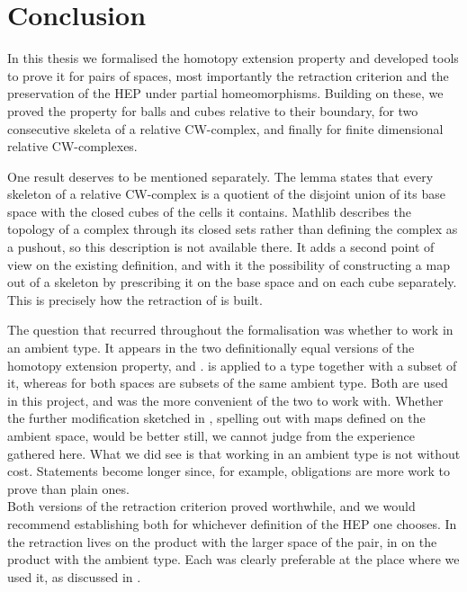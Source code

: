 \documentclass[11pt, a4paper, english]{article}
\theoremstyle{plain}
\theoremstyle{definition}
\theoremstyle{remark}
\numberwithin{equation}{section}
\numberwithin{theorem}{section}
\begin{document}
\clearpage
\section{Conclusion} \label{section:conclusion}
In this thesis we formalised the homotopy extension property and developed tools to prove it for pairs of spaces, most importantly the retraction criterion and the preservation of the HEP under partial homeomorphisms. Building on these, we proved the property for balls and cubes relative to their boundary, for two consecutive skeleta of a relative CW-complex, and finally for finite dimensional relative CW-complexes.

One result deserves to be mentioned separately. The lemma  states that every skeleton of a relative CW-complex is a quotient of the disjoint union of its base space with the closed cubes of the cells it contains. Mathlib describes the topology of a complex through its closed sets rather than defining the complex as a pushout, so this description is not available there. It adds a second point of view on the existing definition, and with it the possibility of constructing a map out of a skeleton by prescribing it on the base space and on each cube separately. This is precisely how the retraction  of  is built.

The question that recurred throughout the formalisation was whether to work in an ambient type. It appears in the two definitionally equal versions of the homotopy extension property,  and .  is applied to a type together with a subset of it, whereas for  both spaces are subsets of the same ambient type. Both are used in this project, and  was the more convenient of the two to work with. Whether the further modification sketched in , spelling  out with maps defined on the ambient space, would be better still, we cannot judge from the experience gathered here. What we did see is that working in an ambient type is not without cost. Statements become longer since, for example,  obligations are more work to prove than plain  ones. \\ 
Both versions of the retraction criterion proved worthwhile, and we would recommend establishing both for whichever definition of the HEP one chooses. In  the retraction lives on the product with the larger space of the pair, in  on the product with the ambient type. Each was clearly preferable at the place where we used it, as discussed in . 
\end{document}
